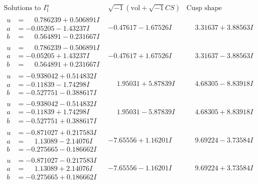 \documentclass[1p]{elsarticle_modified}
\theoremstyle{definition}
\newcommand{\I}{\sqrt{-1}}
\begin{document}
$$\begin{array}{c|c|c}  
\text{Solutions to }I^u_{1}& \I (\text{vol} + \sqrt{-1}CS) & \text{Cusp shape}\\
 \hline 
\begin{aligned}
u &= \phantom{-}0.786239 + 0.506891 I \\
a &= -0.05205 - 1.43237 I \\
b &= \phantom{-}0.564891 - 0.231667 I\end{aligned}
 & -0.47617 - 1.67526 I & \phantom{-}3.31637 + 3.88563 I \\ \hline\begin{aligned}
u &= \phantom{-}0.786239 - 0.506891 I \\
a &= -0.05205 + 1.43237 I \\
b &= \phantom{-}0.564891 + 0.231667 I\end{aligned}
 & -0.47617 + 1.67526 I & \phantom{-}3.31637 - 3.88563 I \\ \hline\begin{aligned}
u &= -0.938042 + 0.514832 I \\
a &= -0.11839 - 1.74298 I \\
b &= -0.527751 - 0.388617 I\end{aligned}
 & \phantom{-}1.95031 + 5.87839 I & \phantom{-}4.68305 - 8.83918 I \\ \hline\begin{aligned}
u &= -0.938042 - 0.514832 I \\
a &= -0.11839 + 1.74298 I \\
b &= -0.527751 + 0.388617 I\end{aligned}
 & \phantom{-}1.95031 - 5.87839 I & \phantom{-}4.68305 + 8.83918 I \\ \hline\begin{aligned}
u &= -0.871027 + 0.217583 I \\
a &= \phantom{-}1.13089 - 2.14076 I \\
b &= -0.275665 - 0.186662 I\end{aligned}
 & -7.65556 + 1.16201 I & \phantom{-}9.69224 - 3.73584 I \\ \hline\begin{aligned}
u &= -0.871027 - 0.217583 I \\
a &= \phantom{-}1.13089 + 2.14076 I \\
b &= -0.275665 + 0.186662 I\end{aligned}
 & -7.65556 - 1.16201 I & \phantom{-}9.69224 + 3.73584 I \\ \hline\begin{aligned}

\end{aligned}
\end{array}$$
\end{document}
